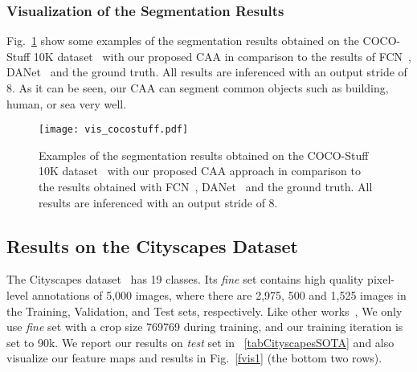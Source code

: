 \documentclass[journal]{IEEEtran}
\begin{document}
\subsubsection{Visualization of the Segmentation Results}

Fig.~\ref{fviscocostuff} show some examples of the segmentation results obtained on the COCO-Stuff 10K dataset~\cite{cCocoStuff} with our proposed CAA in comparison to the results of FCN~\cite{cFCN}, DANet~\cite{cDualAttention} and the ground truth. 
All results are inferenced with an output stride of 8. 
As it can be seen, our CAA can segment common objects such as building, human, or sea very well. 

\begin{figure}[h]
	\centering
	\texttt{[image: vis\_cocostuff.pdf]}
	\caption{Examples of the segmentation results obtained on the COCO-Stuff 10K dataset~\cite{cCocoStuff} with our proposed CAA approach in comparison to the results obtained with FCN~\cite{cFCN}, DANet~\cite{cDualAttention} and the ground truth. All results are inferenced with an output stride of 8.} \label{fviscocostuff}
\end{figure}



\subsection{Results on the Cityscapes Dataset}

The Cityscapes dataset~\cite{cCityScapes} has 19 classes. Its \textit{fine} set contains high quality pixel-level annotations of 5,000 images, where there are 2,975, 500 and 1,525 images in the Training, Validation, and Test sets, respectively.
Like other works~\cite{cSPYGR,cDualAttention}, We only use \textit{fine} set with a crop size 769769 during training, and our training iteration is set to 90k.
We report our results on \textit{test} set in \tablename{~\ref{tabCityscapesSOTA}}  and also visualize our feature maps and results in Fig.~\ref{fvis1} (the bottom two rows). 
\end{document}
